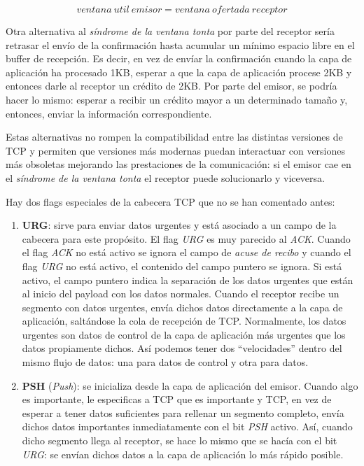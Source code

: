 \documentclass[10pt,a4paper,spanish]{report}
\begin{document}
\begin{displaymath}
  ventana~util~emisor = ventana~ofertada~receptor
\end{displaymath}

Otra alternativa al \textit{\textcolor{tema3}{síndrome de la ventana tonta}} por parte del receptor sería retrasar el envío de la confirmación hasta acumular un mínimo espacio libre en el buffer de recepción. Es decir, en vez de envíar la confirmación cuando la capa de aplicación ha procesado 1KB, esperar a que la capa de aplicación procese 2KB y entonces darle al receptor un crédito de 2KB. Por parte del emisor, se podría hacer lo mismo: esperar a recibir un crédito mayor a un determinado tamaño y, entonces, enviar la información correspondiente.

Estas alternativas no rompen la compatibilidad entre las distintas versiones de TCP y permiten que versiones más modernas puedan interactuar con versiones más obsoletas mejorando las prestaciones de la comunicación: si el emisor cae en el \textit{\textcolor{tema3}{síndrome de la ventana tonta}} el receptor puede solucionarlo y viceversa.

Hay dos flags especiales de la cabecera TCP que no se han comentado antes:
\begin{enumerate}[\color{tema3}{$\heartsuit$}]
  \item \textbf{\textcolor{tema3}{URG}}: sirve para enviar datos urgentes y está asociado a un campo de la cabecera para este propósito. El flag \textit{\textcolor{tema3}{URG}} es muy parecido al \textcolor{tema3}{\textit{ACK}}. Cuando el flag \textit{\textcolor{tema3}{ACK}} no está activo se ignora el campo de \textit{\textcolor{tema3}{acuse de recibo}} y cuando el flag \textit{\textcolor{tema3}{URG}} no está activo, el contenido del campo puntero se ignora. Si está activo, el campo puntero indica la separación de los datos urgentes que están al inicio del payload con los datos normales. Cuando el receptor recibe un segmento con datos urgentes, envía dichos datos directamente a la capa de aplicación, saltándose la cola de recepción de TCP. Normalmente, los datos urgentes son datos de control de la capa de aplicación más urgentes que los datos propiamente dichos. Así podemos tener dos ``velocidades'' dentro del mismo flujo de datos: una para datos de control y otra para datos.
  \item \textbf{\textcolor{tema3}{PSH}} (\textcolor{tema3}{\textit{Push}}): se inicializa desde la capa de aplicación del emisor. Cuando algo es importante, le especificas a TCP que es importante y TCP, en vez de esperar a tener datos suficientes para rellenar un segmento completo, envía dichos datos importantes inmediatamente con el bit \textcolor{tema3}{\textit{PSH}} activo. Así, cuando dicho segmento llega al receptor, se hace lo mismo que se hacía con el bit \textit{\textcolor{tema3}{URG}}: se envían dichos datos a la capa de aplicación lo más rápido posible. 
\end{enumerate}
\end{document}
